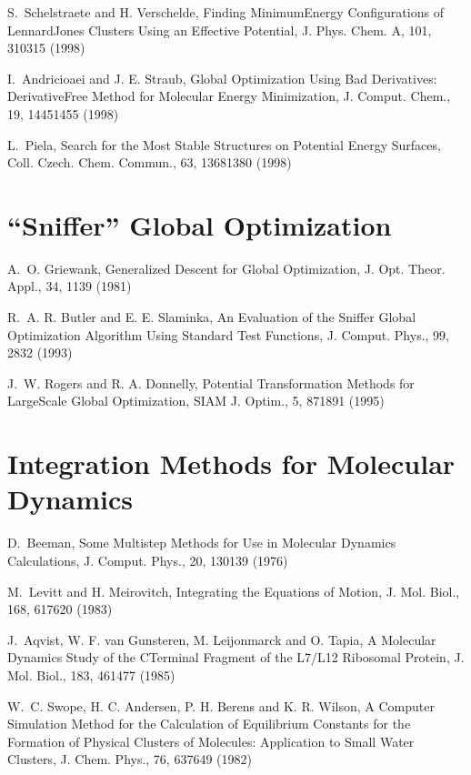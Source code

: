 \documentclass[letterpaper,11pt,english]{sphinxmanual}
\begin{document}
S. Schelstraete and H. Verschelde, Finding Minimum\sphinxhyphen{}Energy Configurations of Lennard\sphinxhyphen{}Jones Clusters Using an Effective Potential, J. Phys. Chem. A, 101, 310\sphinxhyphen{}315 (1998)

I. Andricioaei and J. E. Straub, Global Optimization Using Bad Derivatives: Derivative\sphinxhyphen{}Free Method for Molecular Energy Minimization, J. Comput. Chem., 19, 1445\sphinxhyphen{}1455 (1998)

L. Piela, Search for the Most Stable Structures on Potential Energy Surfaces, Coll. Czech. Chem. Commun., 63, 1368\sphinxhyphen{}1380 (1998)


\section{“Sniffer” Global Optimization}
\label{\detokenize{text/references:sniffer-global-optimization}}
A. O. Griewank, Generalized Descent for Global Optimization, J. Opt. Theor. Appl., 34, 11\sphinxhyphen{}39 (1981)

R. A. R. Butler and E. E. Slaminka, An Evaluation of the Sniffer Global Optimization Algorithm Using Standard Test Functions, J. Comput. Phys., 99, 28\sphinxhyphen{}32 (1993)

J. W. Rogers and R. A. Donnelly, Potential Transformation Methods for Large\sphinxhyphen{}Scale Global Optimization, SIAM J. Optim., 5, 871\sphinxhyphen{}891 (1995)


\section{Integration Methods for Molecular Dynamics}
\label{\detokenize{text/references:integration-methods-for-molecular-dynamics}}
D. Beeman, Some Multistep Methods for Use in Molecular Dynamics Calculations, J. Comput. Phys., 20, 130\sphinxhyphen{}139 (1976)

M. Levitt and H. Meirovitch, Integrating the Equations of Motion, J. Mol. Biol., 168, 617\sphinxhyphen{}620 (1983)

J. Aqvist, W. F. van Gunsteren, M. Leijonmarck and O. Tapia, A Molecular Dynamics Study of the C\sphinxhyphen{}Terminal Fragment of the L7/L12 Ribosomal Protein, J. Mol. Biol., 183, 461\sphinxhyphen{}477 (1985)

W. C. Swope, H. C. Andersen, P. H. Berens and K. R. Wilson, A Computer Simulation Method for the Calculation of Equilibrium Constants for the Formation of Physical Clusters of Molecules: Application to Small Water Clusters, J. Chem. Phys., 76, 637\sphinxhyphen{}649 (1982)
\end{document}

